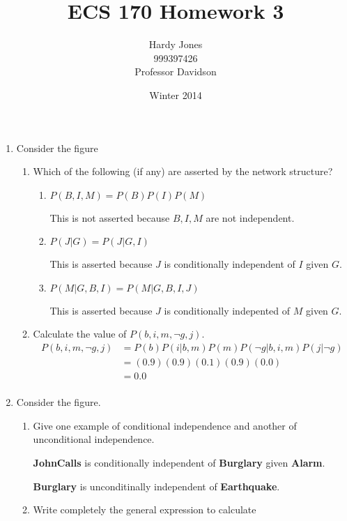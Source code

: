 \documentclass[12pt,letterpaper]{article}
\title{ECS 170 Homework 3\vspace{-2ex}}
\author{Hardy Jones\\
        999397426\\
        Professor Davidson\vspace{-2ex}}
\date{Winter 2014}
\begin{document}
  \maketitle

  \begin{enumerate}
    \item
      Consider the figure
      \begin{enumerate}
        \item Which of the following (if any) are asserted by the network structure?
          \begin{enumerate}
            \item $P(B,I,M) = P(B)P(I)P(M)$

              This is not asserted because $B, I, M$ are not independent.
            \item $P(J|G) = P(J|G,I)$

              This is asserted because $J$ is conditionally independent of $I$ given $G$.
            \item $P(M|G,B,I) = P(M|G,B,I,J)$

              This is asserted because $J$ is conditionally indepented of $M$ given $G$.
          \end{enumerate}

        \item Calculate the value of $P(b,i,m,\neg g,j)$.
          \begin{align*}
            P(b,i,m,\neg g,j) &= P(b)P(i|b,m)P(m)P(\neg g|b,i,m)P(j|\neg g)\\
            &= (0.9)(0.9)(0.1)(0.9)(0.0)\\
            &= 0.0\\
          \end{align*}
      \end{enumerate}
    \item Consider the figure.
      \begin{enumerate}
        \item Give one example of conditional independence and another of unconditional independence.

          \textbf{JohnCalls} is conditionally independent of \textbf{Burglary} given \textbf{Alarm}.

          \textbf{Burglary} is unconditinally independent of \textbf{Earthquake}.

        \item Write completely the general expression to calculate


\end{enumerate}
\end{enumerate}
\end{document}
